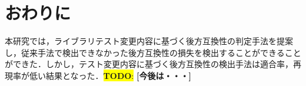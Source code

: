 \documentclass[T,J]{fose} %
\newcommand{\todo}[1]{\colorbox{yellow}{{\bf TODO}:}{\color{red} {\textbf{[#1]}}}}
\begin{document}
\section{おわりに}
本研究では，ライブラリテスト変更内容に基づく後方互換性の判定手法を提案し，従来手法で検出できなかった後方互換性の損失を検出することができることができた．しかし，テスト変更内容に基づく後方互換性の検出手法は適合率，再現率が低い結果となった．\todo{今後は・・・}


\vspace{-5pt}




\end{document}

